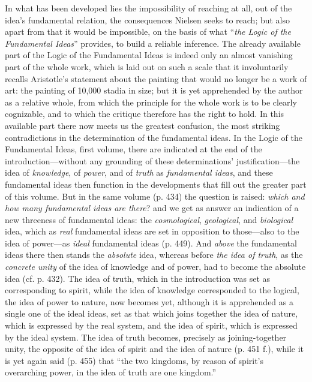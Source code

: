 \documentclass[12pt,a4paper]{book}
\begin{document}
In what has been developed lies the impossibility of reaching at all, out of the idea's
fundamental relation, the consequences Nielsen seeks to reach; but also apart from that it
would be impossible, on the basis of what ``\emph{the Logic of the Fundamental Ideas}''
provides, to build a reliable inference. The already available part of the Logic of the
Fundamental Ideas is indeed only an almost vanishing part of the whole work, which is laid out
on such a scale that it involuntarily recalls Aristotle's statement about the painting that
would no longer be a work of art: the painting of 10,000 stadia in size; but it is yet
apprehended by the author as a relative whole, from which the principle for the whole work is
to be clearly cognizable, and to which the critique therefore has the right to hold. In this
available part there now meets us the greatest confusion, the most striking contradictions in
the determination of the fundamental ideas. In the Logic of the Fundamental Ideas, first volume,
there are indicated at the end of the introduction---without any grounding of these
determinations' justification---the idea of \emph{knowledge}, of \emph{power}, and of \emph{truth} as
\emph{fundamental ideas}, and these fundamental ideas then function in the developments that fill out
the greater part of this volume. But in the same volume (p. 434) the question is raised:
\emph{which and how many fundamental ideas are there}? and we get as answer an indication of a
new threeness of fundamental ideas: the \emph{cosmological}, \emph{geological}, and \emph{biological} idea,
which as \emph{real} fundamental ideas are set in opposition to those---also to the idea
of power---as \emph{ideal} fundamental ideas (p. 449). And \emph{above} the fundamental ideas
there then stands the \emph{absolute} idea, whereas before \emph{the idea of truth}, as the \emph{concrete
unity} of the idea of knowledge and of power, had to become the absolute idea (cf. p. 432). The
idea of truth, which in the introduction was set as corresponding to spirit, while the idea of
knowledge corresponded to the logical, the idea of power to nature, now becomes yet, although it
is apprehended as a single one of the ideal ideas, set as that which joins together the idea of
nature, which is expressed by the real system, and the idea of spirit, which is expressed by the
ideal system. The idea of truth becomes, precisely as joining-together unity, the opposite of the
idea of spirit and the idea of nature (p. 451 f.), while it is yet again said (p. 455) that ``the
two kingdoms, by reason of spirit's overarching power, in the idea of truth are one kingdom.''
\end{document}
